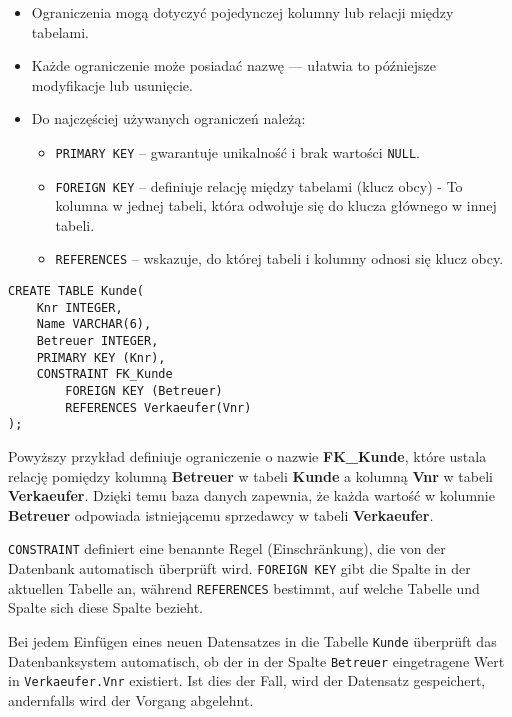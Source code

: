 \begin{itemize}
    \item Ograniczenia mogą dotyczyć pojedynczej kolumny lub relacji między tabelami.
    \item Każde ograniczenie może posiadać nazwę — ułatwia to późniejsze modyfikacje lub usunięcie.
    \item Do najczęściej używanych ograniczeń należą:
    \begin{itemize}
        \item \texttt{PRIMARY KEY} – gwarantuje unikalność i brak wartości \texttt{NULL}.
        \item \texttt{FOREIGN KEY} – definiuje relację między tabelami (klucz obcy) - To kolumna w jednej tabeli, która odwołuje się do klucza głównego w innej tabeli.
        \item \texttt{REFERENCES} – wskazuje, do której tabeli i kolumny odnosi się klucz obcy.
    \end{itemize}
\end{itemize}

\begin{lstlisting}[style=sqlstyle]
CREATE TABLE Kunde(
    Knr INTEGER,
    Name VARCHAR(6),
    Betreuer INTEGER,
    PRIMARY KEY (Knr),
    CONSTRAINT FK_Kunde
        FOREIGN KEY (Betreuer)
        REFERENCES Verkaeufer(Vnr)
);
\end{lstlisting}

Powyższy przykład definiuje ograniczenie o nazwie \textbf{FK\_Kunde}, 
które ustala relację pomiędzy kolumną \textbf{Betreuer} w tabeli \textbf{Kunde} 
a kolumną \textbf{Vnr} w tabeli \textbf{Verkaeufer}. 
Dzięki temu baza danych zapewnia, że każda wartość w kolumnie \textbf{Betreuer} 
odpowiada istniejącemu sprzedawcy w tabeli \textbf{Verkaeufer}.

\begin{tcolorbox}[blue, title={Hinweis}]
    \texttt{CONSTRAINT} definiert eine benannte Regel (Einschränkung), 
    die von der Datenbank automatisch überprüft wird.  
    \texttt{FOREIGN KEY} gibt die Spalte in der aktuellen Tabelle an, 
    während \texttt{REFERENCES} bestimmt, auf welche Tabelle und Spalte 
    sich diese Spalte bezieht.  

    Bei jedem Einfügen eines neuen Datensatzes in die Tabelle \texttt{Kunde} 
    überprüft das Datenbanksystem automatisch, ob der in der Spalte 
    \texttt{Betreuer} eingetragene Wert in \texttt{Verkaeufer.Vnr} existiert.  
    Ist dies der Fall, wird der Datensatz gespeichert,  
    andernfalls wird der Vorgang abgelehnt.
\end{tcolorbox}


